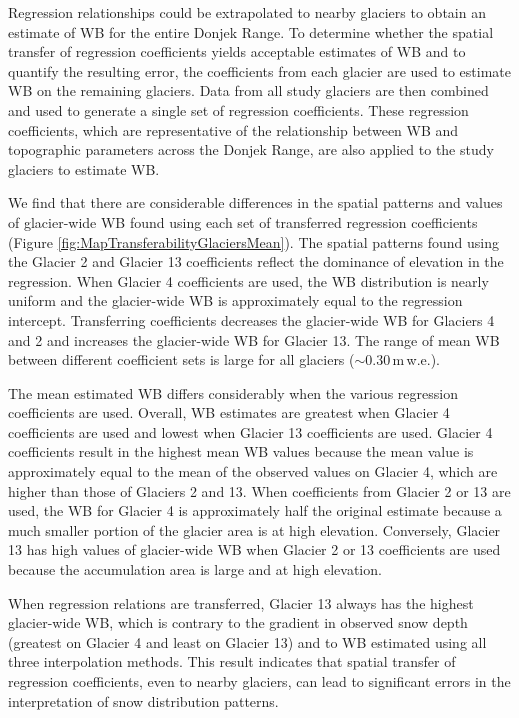 \documentclass{sfuthesis}
\begin{document}
{Regression relationships could be extrapolated to nearby glaciers to obtain an estimate of WB for the entire Donjek Range. To determine whether the spatial transfer of regression coefficients yields acceptable estimates of WB and to quantify the resulting error, the coefficients from each glacier are used to estimate WB on the remaining glaciers. Data from all study glaciers are then combined and used to generate a single set of regression coefficients. These regression coefficients, which are representative of the relationship between WB and topographic parameters across the Donjek Range, are also applied to the study glaciers to estimate WB.

We find that there are considerable differences in the spatial patterns and values of glacier-wide WB found using each set of transferred regression coefficients (Figure \ref{fig:MapTransferabilityGlaciersMean}). The spatial patterns found using the Glacier 2 and Glacier 13 coefficients reflect the dominance of elevation in the regression. When Glacier 4 coefficients are used, the WB distribution is nearly uniform and the glacier-wide WB is approximately equal to the regression intercept. Transferring coefficients decreases the glacier-wide WB for Glaciers 4 and 2 and increases the glacier-wide WB for Glacier 13. The range of mean WB between different coefficient sets is large for all glaciers ($\sim$0.30\,m\,w.e.). 

The mean estimated WB differs considerably when the various regression coefficients are used. Overall, WB estimates are greatest when Glacier 4 coefficients are used and lowest when Glacier 13 coefficients are used. Glacier 4 coefficients result in the highest mean WB values because the mean value is approximately equal to the mean of the observed values on Glacier 4, which are higher than those of Glaciers 2 and 13. When coefficients from Glacier 2 or 13 are used, the WB for Glacier 4 is approximately half the original estimate because a much smaller portion of the glacier area is at high elevation. Conversely, Glacier 13 has high values of glacier-wide WB when Glacier 2 or 13 coefficients are used because the accumulation area is large and at high elevation. 

When regression relations are transferred, Glacier 13 always has the highest glacier-wide WB, which is contrary to the gradient in observed snow depth (greatest on Glacier 4 and least on Glacier 13) and to WB estimated using all three interpolation methods. This result indicates that spatial transfer of regression coefficients, even to nearby glaciers, can lead to significant errors in the interpretation of snow distribution patterns.

}
\end{document}
